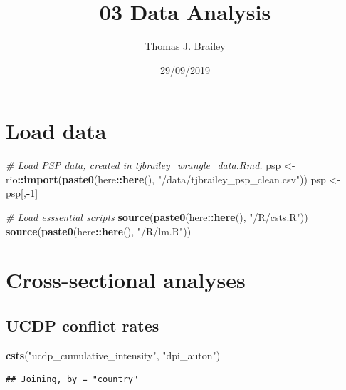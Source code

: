 \documentclass[
]{article}
\title{03 Data Analysis}
\author{Thomas J. Brailey}
\date{29/09/2019}
\newenvironment{Shaded}{\begin{snugshade}}{\end{snugshade}}
\newcommand{\CommentTok}[1]{\textcolor[rgb]{0.56,0.35,0.01}{\textit{#1}}}
\newcommand{\DecValTok}[1]{\textcolor[rgb]{0.00,0.00,0.81}{#1}}
\newcommand{\KeywordTok}[1]{\textcolor[rgb]{0.13,0.29,0.53}{\textbf{#1}}}
\newcommand{\NormalTok}[1]{#1}
\newcommand{\OperatorTok}[1]{\textcolor[rgb]{0.81,0.36,0.00}{\textbf{#1}}}
\newcommand{\StringTok}[1]{\textcolor[rgb]{0.31,0.60,0.02}{#1}}
\begin{document}
\maketitle

{
\setcounter{tocdepth}{2}
\tableofcontents
}
\hypertarget{load-data}{%
\section{Load data}\label{load-data}}

\begin{Shaded}
\begin{Highlighting}[]
\CommentTok{# Load PSP data, created in tjbrailey_wrangle_data.Rmd.}
\NormalTok{psp <-}\StringTok{ }\NormalTok{rio}\OperatorTok{::}\KeywordTok{import}\NormalTok{(}\KeywordTok{paste0}\NormalTok{(here}\OperatorTok{::}\KeywordTok{here}\NormalTok{(), }\StringTok{"/data/tjbrailey_psp_clean.csv"}\NormalTok{))}
\NormalTok{psp <-}\StringTok{ }\NormalTok{psp[,}\OperatorTok{-}\DecValTok{1}\NormalTok{]}

\CommentTok{# Load esssential scripts}
\KeywordTok{source}\NormalTok{(}\KeywordTok{paste0}\NormalTok{(here}\OperatorTok{::}\KeywordTok{here}\NormalTok{(), }\StringTok{"/R/csts.R"}\NormalTok{))}
\KeywordTok{source}\NormalTok{(}\KeywordTok{paste0}\NormalTok{(here}\OperatorTok{::}\KeywordTok{here}\NormalTok{(), }\StringTok{"/R/lm.R"}\NormalTok{))}
\end{Highlighting}
\end{Shaded}

\hypertarget{cross-sectional-analyses}{%
\section{Cross-sectional analyses}\label{cross-sectional-analyses}}

\hypertarget{ucdp-conflict-rates}{%
\subsection{UCDP conflict rates}\label{ucdp-conflict-rates}}

\begin{Shaded}
\begin{Highlighting}[]
\KeywordTok{csts}\NormalTok{(}\StringTok{"ucdp_cumulative_intensity"}\NormalTok{, }\StringTok{"dpi_auton"}\NormalTok{)}
\end{Highlighting}
\end{Shaded}

\begin{verbatim}
## Joining, by = "country"
\end{verbatim}
\end{document}
